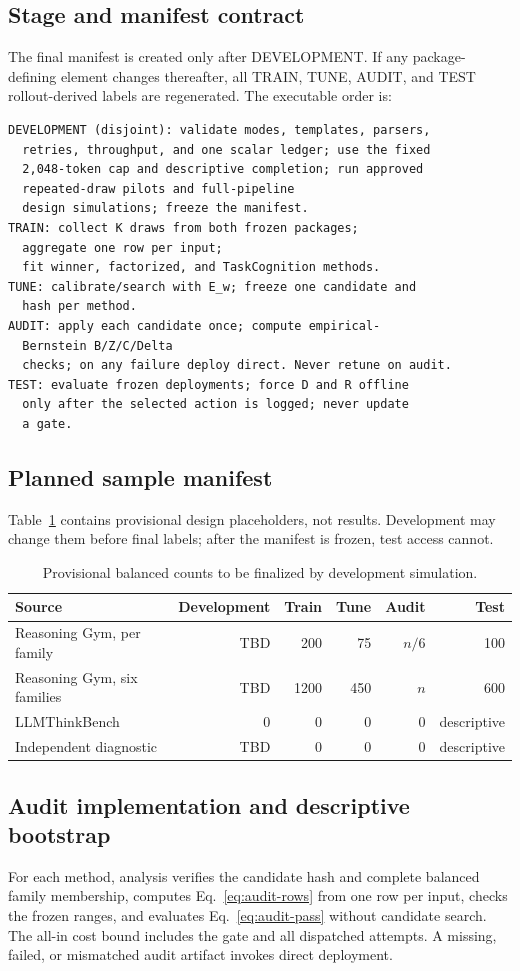 \documentclass{article}
\newcommand{\1}{\mathbb{I}}
\begin{document}
\subsection{Stage and manifest contract}
The final manifest is created only after DEVELOPMENT. If any package-defining element changes thereafter, all TRAIN, TUNE, AUDIT, and TEST rollout-derived labels are regenerated. The executable order is:
\begin{verbatim}
DEVELOPMENT (disjoint): validate modes, templates, parsers,
  retries, throughput, and one scalar ledger; use the fixed
  2,048-token cap and descriptive completion; run approved
  repeated-draw pilots and full-pipeline
  design simulations; freeze the manifest.
TRAIN: collect K draws from both frozen packages;
  aggregate one row per input;
  fit winner, factorized, and TaskCognition methods.
TUNE: calibrate/search with E_w; freeze one candidate and
  hash per method.
AUDIT: apply each candidate once; compute empirical-
  Bernstein B/Z/C/Delta
  checks; on any failure deploy direct. Never retune on audit.
TEST: evaluate frozen deployments; force D and R offline
  only after the selected action is logged; never update
  a gate.
\end{verbatim}

\subsection{Planned sample manifest}
Table~\ref{tab:manifest} contains provisional design placeholders, not results. Development may change them before final labels; after the manifest is frozen, test access cannot.
\begin{table}[t]
\caption{Provisional balanced counts to be finalized by development simulation.}
\label{tab:manifest}
\centering\small
\begin{tabular}{lrrrrr}
\toprule
Source & Development & Train & Tune & Audit & Test \\
\midrule
Reasoning Gym, per family & TBD & 200 & 75 & $n/6$ & 100 \\
Reasoning Gym, six families & TBD & 1200 & 450 & $n$ & 600 \\
LLMThinkBench & 0 & 0 & 0 & 0 & descriptive \\
Independent diagnostic & TBD & 0 & 0 & 0 & descriptive \\
\bottomrule
\end{tabular}
\end{table}

\subsection{Audit implementation and descriptive bootstrap}
For each method, analysis verifies the candidate hash and complete balanced family membership, computes Eq.~\ref{eq:audit-rows} from one row per input, checks the frozen ranges, and evaluates Eq.~\ref{eq:audit-pass} without candidate search. The all-in cost bound includes the gate and all dispatched attempts. A missing, failed, or mismatched audit artifact invokes direct deployment.
\end{document}
